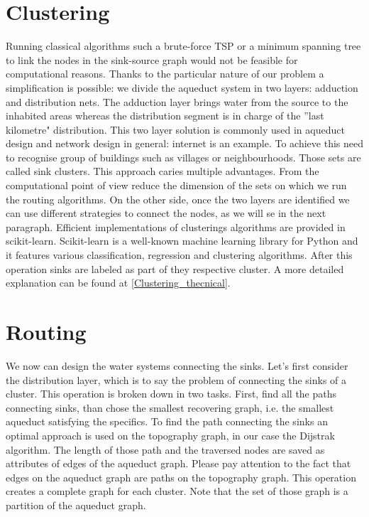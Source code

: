 \section{Clustering}
Running classical algorithms such a brute-force TSP or a minimum spanning tree to link
the nodes in the sink-source graph would not be feasible for computational reasons. 
Thanks to the particular nature of our problem a simplification is possible: we divide the aqueduct
system in two layers: adduction and distribution nets. The adduction layer brings water from the
source to the inhabited areas whereas the distribution segment is in charge of the ”last kilometre" 
distribution. This two layer solution is commonly used in aqueduct design and network design in 
general: internet is an example. To achieve this need to recognise group of buildings such as villages 
or neighbourhoods. Those sets are called sink clusters.
This approach caries multiple advantages. From the computational point of view reduce the dimension 
of the sets on which we run the routing algorithms.  On the other side, once the two layers are 
identified we can use different strategies to connect the nodes, as we will se in the next paragraph.
Efficient implementations of clusterings algorithms are provided in scikit-learn. Scikit-learn is a 
well-known machine learning library for Python and it features various classification, regression and
clustering algorithms. After this operation sinks are labeled as part of they respective cluster. 
A more detailed explanation can be found at \ref{Clustering_thecnical}.

\section{Routing}
\label{Routing}
We now can design the water systems connecting the sinks. Let’s first consider the distribution layer,
which is to say the problem of connecting the sinks of a cluster. This operation is broken down in two 
tasks. First, find all the paths connecting sinks, than chose the smallest recovering graph, i.e. the 
smallest aqueduct satisfying the specifics. \hfill 
To find the path connecting the sinks an optimal approach is used on the topography graph, in our case
the Dijstrak algorithm. The length of those path and the traversed nodes are saved as attributes of 
edges of the aqueduct graph. Please pay attention to the fact that edges on the aqueduct graph are 
paths on the topography graph. This operation creates a complete graph for each cluster. Note that the 
set of those graph is a partition of the aqueduct graph. \hfill 


